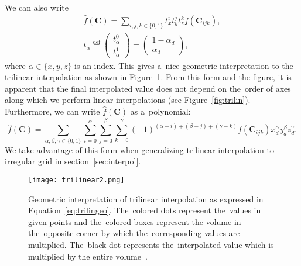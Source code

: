 				\noindent We can also write
					\begin{eqnarray}
						\label{eq:trilingeo}
						\widehat{f}(\mathbf{C}) = \sum_{i,j,k \in \{0,1\}} t_x^i t_y^j t_z^k f(\mathbf{C}_{ijk}),\\
						t_\alpha \stackrel{\text{def}}{=} \begin{pmatrix}t_\alpha^0\\ t_\alpha^1\end{pmatrix} = \begin{pmatrix}1-\alpha_d\\ \alpha_d\end{pmatrix},
					\end{eqnarray}
				where $\alpha \in \{x,y,z\}$ is an index. This gives a~nice geometric interpretation to the trilinear interpolation as shown in Figure~\ref{fig:trilin2}. From this form and the figure, it is apparent that the final interpolated value does not depend on the~order of axes along which we perform linear interpolations (see Figure~\ref{fig:trilin}). Furthermore, we can write $\widehat{f}(\mathbf{C})$ as a~polynomial:
					\begin{equation}
						\label{eq:trilinpoly}
						\widehat{f}(\mathbf{C}) = \sum_{\alpha,\beta,\gamma \in \{0,1\}}\sum^{\alpha}_{i=0}\sum^{\beta}_{j=0}\sum^{\gamma}_{k=0} 	(-1)^{(\alpha-i)+(\beta-j)+(\gamma-k)} f(\mathbf{C}_{ijk}) x_d^\alpha y_d^\beta z_d^\gamma.
					\end{equation}
				We take advantage of this form when generalizing trilinear interpolation to irregular grid in section~\ref{sec:interpol}.
					
				\begin{figure}
					\centering
					\texttt{[image: trilinear2.png]}
					\caption{Geometric interpretation of trilinear interpolation as expressed in Equation~\ref{eq:trilingeo}. The~colored dots represent the~values in given points and the~colored boxes represent the volume in the~opposite corner by which the~corresponding values are multiplied. The~black dot represents the~interpolated value which is multiplied by the entire volume~\cite{trilinear}.}
					\label{fig:trilin2}
				\end{figure}
				
